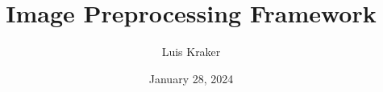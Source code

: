 \author{Luis Kraker}
\title[PCB Defect Detection]{Image Preprocessing Framework}
\date{January 28, 2024} 



